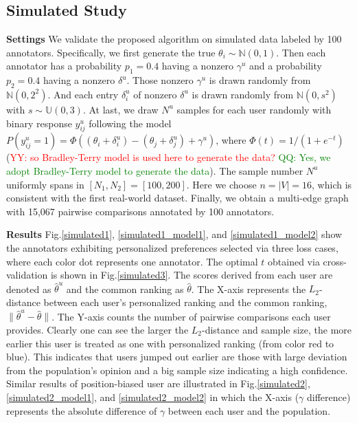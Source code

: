 \documentclass[10pt,journal,cspaper,compsoc]{IEEEtran}
\def\N{{\mathbb N}}
\begin{document}
{\subsection{Simulated Study}
\textbf{Settings} We validate the proposed algorithm on simulated data labeled by 100 annotators.
Specifically, we first generate the true $\theta_i \sim \N(0,1)$.
Then each annotator has a probability $p_1 = 0.4$ having a nonzero $\gamma^u$ and a probability $p_2 = 0.4$ having a nonzero $\delta^u$.
Those nonzero $\gamma^u$ is drawn randomly from $\N(0,2^2)$. And each entry $\delta_i^u$ of nonzero $\delta^u$ is drawn randomly from $\N(0,s^2)$ with $s \sim \mathbb{U}(0,3)$.
At last, we draw $N^u$ samples for each user randomly with binary response $y^u_{ij}$ following the model $P(y^u_{ij} = 1) = \Phi((\theta_i+\delta_i^u) - (\theta_j+\delta_j^u) + \gamma^u)$, where $\Phi(t) = 1/(1+e^{-t})$ (\textcolor{red}{YY: so Bradley-Terry model is used here to generate the data?} \textcolor{green}{QQ: Yes, we adopt Bradley-Terry model to generate the data}).
 The sample number $N^u$ uniformly spans in $[N_1,N_2] = [100,200]$. Here we choose $n=|V|=16$, which is consistent with the first real-world dataset.  Finally, we obtain a multi-edge graph with 15,067 pairwise comparisons annotated by 100 annotators.





\textbf{Results} Fig.\ref{simulated1}, \ref{simulated1_model1}, and \ref{simulated1_model2} show the annotators exhibiting personalized preferences selected via three loss cases, where each color dot represents one annotator. The optimal $t$ obtained via cross-validation is shown in Fig.\ref{simulated3}. The scores derived from each user are denoted as $\hat{\theta}^u$ and the common ranking as $\hat{\theta}$. The X-axis represents the $L_2$-distance between each user's personalized ranking and the common ranking, $\|\hat{\theta}^u-\hat{\theta}\|$. The Y-axis counts the number of pairwise comparisons each user provides.
Clearly one can see the larger the $L_2$-distance and sample size, the more earlier this user is treated as one with personalized ranking (from color red to blue). This indicates that users jumped out earlier are those with large deviation from the population's opinion and a big sample size indicating a high confidence. Similar results of position-biased user are illustrated in Fig.\ref{simulated2}, \ref{simulated2_model1}, and \ref{simulated2_model2} in which the X-axis ($\gamma$ difference) represents the absolute difference of $\gamma$ between each user and the population.


}
\end{document}
